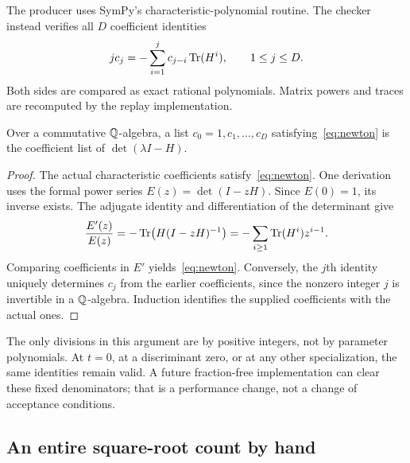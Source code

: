 The producer uses SymPy's characteristic-polynomial routine. The checker instead verifies all $D$ coefficient identities
\begin{equation}\label{eq:newton}
jc_j=-\sum_{i=1}^j c_{j-i}\operatorname{Tr}(H^i),\qquad 1\leq j\leq D.
\end{equation}
Both sides are compared as exact rational polynomials. Matrix powers and traces are recomputed by the replay implementation.

\begin{lemma}\label{lem:newton}
Over a commutative $\mathbb Q$-algebra, a list $c_0=1,c_1,\ldots,c_D$ satisfying~\eqref{eq:newton} is the coefficient list of $\det(\lambda I-H)$.
\end{lemma}
\begin{proof}
The actual characteristic coefficients satisfy~\eqref{eq:newton}. One derivation uses the formal power series $E(z)=\det(I-zH)$. Since $E(0)=1$, its inverse exists. The adjugate identity and differentiation of the determinant give
\[
\frac{E'(z)}{E(z)}=-\operatorname{Tr}\bigl(H(I-zH)^{-1}\bigr)
=-\sum_{i\geq1}\operatorname{Tr}(H^i)z^{i-1}.
\]
Comparing coefficients in $E'$ yields~\eqref{eq:newton}. Conversely, the $j$th identity uniquely determines $c_j$ from the earlier coefficients, since the nonzero integer $j$ is invertible in a $\mathbb Q$-algebra. Induction identifies the supplied coefficients with the actual ones.
\end{proof}

The only divisions in this argument are by positive integers, not by parameter polynomials. At $t=0$, at a discriminant zero, or at any other specialization, the same identities remain valid. A future fraction-free implementation can clear these fixed denominators; that is a performance change, not a change of acceptance conditions.

\subsection{An entire square-root count by hand}

